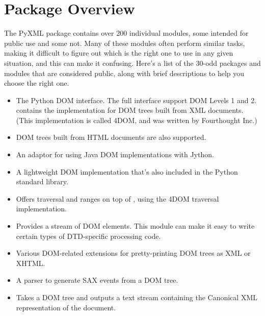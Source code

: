 \documentclass{howto}
\begin{document}
\section{Package Overview}

The PyXML package contains over 200 individual modules, some intended
for public use and some not.  Many of these modules often perform
similar tasks, making it difficult to figure out which is the right
one to use in any given situation, and this can make it confusing.
Here's a list of the 30-odd packages and modules that are considered
public, along with brief descriptions to help you choose the right
one.

\begin{itemize}

\item[\module{xml.dom}]
  The Python DOM interface.  The full interface
  support DOM Levels 1 and 2.   contains
  the implementation for DOM trees built from XML documents.
  (This implementation is called 4DOM, and was written by Fourthought Inc.)
  
\item[\module{dom.html}]
  DOM trees built from HTML documents are also supported.

\item[\module{dom.javadom}]
  An adaptor for using Java DOM implementations with Jython.

\item[\module{dom.minidom}]
  A lightweight DOM implementation that's also included in the Python
  standard library.  

\item[\module{dom.minitraversal}]
  Offers traversal and ranges on top of
  , using the 4DOM traversal implementation.

\item[\module{dom.pulldom}]
  Provides a stream of DOM elements.  This module can make it easy 
  to write certain types of DTD-specific processing code.

\item[\module{dom.ext}]
  Various DOM-related extensions for pretty-printing DOM trees as XML or XHTML.

\item[\module{dom.ext.Dom2Sax}]
  A parser to generate SAX events from a DOM tree.

\item[\module{dom.ext.c14n}]
  Takes a DOM tree and outputs a text stream containing the
  Canonical XML representation of the document.


\end{itemize}
\end{document}

